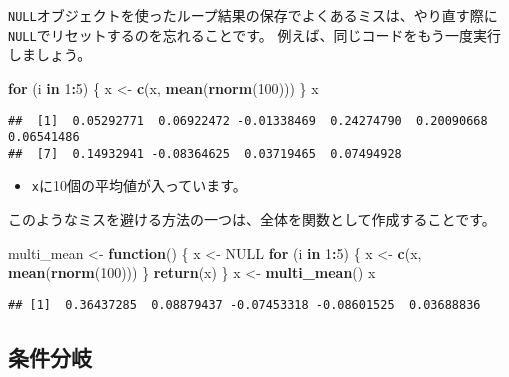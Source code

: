 \documentclass[]{bxjsarticle}
\newenvironment{Shaded}{\begin{snugshade}}{\end{snugshade}}
\newcommand{\ControlFlowTok}[1]{\textcolor[rgb]{0.13,0.29,0.53}{\textbf{#1}}}
\newcommand{\DecValTok}[1]{\textcolor[rgb]{0.00,0.00,0.81}{#1}}
\newcommand{\KeywordTok}[1]{\textcolor[rgb]{0.13,0.29,0.53}{\textbf{#1}}}
\newcommand{\NormalTok}[1]{#1}
\newcommand{\OperatorTok}[1]{\textcolor[rgb]{0.81,0.36,0.00}{\textbf{#1}}}
\newcommand{\OtherTok}[1]{\textcolor[rgb]{0.56,0.35,0.01}{#1}}
\newcommand{\StringTok}[1]{\textcolor[rgb]{0.31,0.60,0.02}{#1}}
\providecommand{\tightlist}{%
  \setlength{\itemsep}{0pt}\setlength{\parskip}{0pt}}
\begin{document}
\texttt{NULL}オブジェクトを使ったループ結果の保存でよくあるミスは、やり直す際に\texttt{NULL}でリセットするのを忘れることです。
例えば、同じコードをもう一度実行しましょう。

\begin{Shaded}
\begin{Highlighting}[]
\ControlFlowTok{for}\NormalTok{ (i }\ControlFlowTok{in} \DecValTok{1}\OperatorTok{:}\DecValTok{5}\NormalTok{) \{}
\NormalTok{  x <-}\StringTok{ }\KeywordTok{c}\NormalTok{(x, }\KeywordTok{mean}\NormalTok{(}\KeywordTok{rnorm}\NormalTok{(}\DecValTok{100}\NormalTok{)))}
\NormalTok{\}}
\NormalTok{x}
\end{Highlighting}
\end{Shaded}

\begin{verbatim}
##  [1]  0.05292771  0.06922472 -0.01338469  0.24274790  0.20090668  0.06541486
##  [7]  0.14932941 -0.08364625  0.03719465  0.07494928
\end{verbatim}

\begin{itemize}
\tightlist
\item
  \texttt{x}に10個の平均値が入っています。
\end{itemize}

このようなミスを避ける方法の一つは、全体を関数として作成することです。

\begin{Shaded}
\begin{Highlighting}[]
\NormalTok{multi_mean <-}\StringTok{ }\ControlFlowTok{function}\NormalTok{() \{}
\NormalTok{  x <-}\StringTok{ }\OtherTok{NULL}
  \ControlFlowTok{for}\NormalTok{ (i }\ControlFlowTok{in} \DecValTok{1}\OperatorTok{:}\DecValTok{5}\NormalTok{) \{}
\NormalTok{    x <-}\StringTok{ }\KeywordTok{c}\NormalTok{(x, }\KeywordTok{mean}\NormalTok{(}\KeywordTok{rnorm}\NormalTok{(}\DecValTok{100}\NormalTok{)))}
\NormalTok{  \}}
  \KeywordTok{return}\NormalTok{(x)}
\NormalTok{\}}
\NormalTok{x <-}\StringTok{ }\KeywordTok{multi_mean}\NormalTok{()}
\NormalTok{x}
\end{Highlighting}
\end{Shaded}

\begin{verbatim}
## [1]  0.36437285  0.08879437 -0.07453318 -0.08601525  0.03688836
\end{verbatim}

\hypertarget{ux6761ux4ef6ux5206ux5c90}{%
\subsection{条件分岐}\label{ux6761ux4ef6ux5206ux5c90}}
\end{document}
